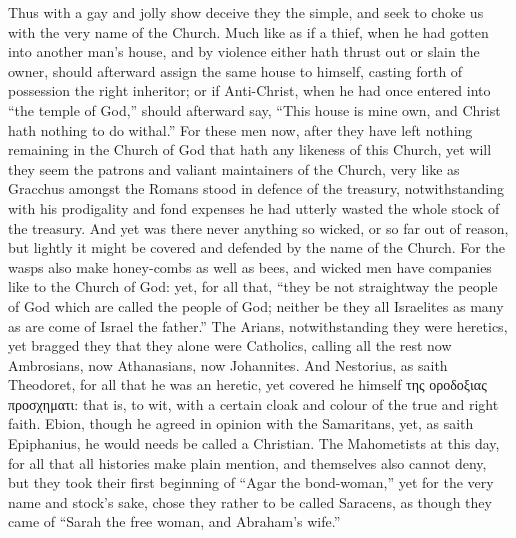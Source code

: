 Thus with a gay and jolly show deceive they the simple, and seek
to choke us with the very name of the
Church. Much like as if a thief, when he had gotten into another
man’s house, and by violence either hath thrust out or slain the
owner, should afterward assign the same house to himself, casting forth
of possession the right inheritor; or if Anti-Christ, when he had once
entered into “the temple of God,” should afterward say,
“This house is mine own, and Christ hath nothing to do withal.”
For these men now, after they have left nothing remaining in the Church
of God that hath any likeness of this Church, yet will they seem the
patrons and valiant maintainers of the Church, very like as Gracchus
amongst the Romans stood in defence of the treasury, notwithstanding
with his prodigality and fond expenses he had utterly wasted the whole
stock of the treasury. And yet was there never anything so wicked,
or so far out of reason, but lightly it might be covered and defended
by the name of the Church. For the wasps also make honey-combs
as well as bees, and wicked men have companies like to the Church of
God: yet, for all that, “they be not straightway the people of
God which are called the people of God; neither be they all Israelites
as many as are come of Israel the father.” The Arians, notwithstanding
they were heretics, yet bragged they that they alone were Catholics,
calling all the
rest now Ambrosians, now Athanasians, now Johannites. And Nestorius,
as saith Theodoret, for all that he was an heretic, yet covered he himself
της οροδοξιας
προσχηματι: that is,
to wit, with a certain cloak and colour of the true and right faith.
Ebion, though he agreed in opinion with the Samaritans, yet, as saith
Epiphanius, he would needs be called a Christian. The Mahometists
at this day, for all that all histories make plain mention, and themselves
also cannot deny, but they took their first beginning of “Agar
the bond-woman,” yet for the very name and stock’s sake,
chose they rather to be called Saracens, as though they came of “Sarah
the free woman, and Abraham’s wife.”

